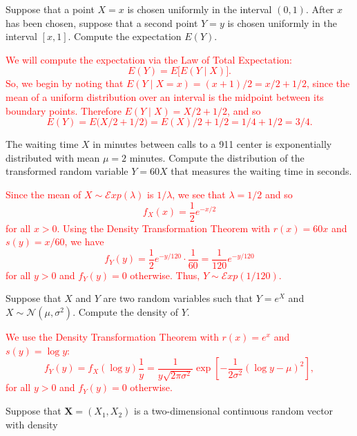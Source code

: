 \documentclass[12pt,reqno]{amsart}
\begin{document}
\prob Suppose that a point $X=x$ is chosen uniformly in the interval $(0,1)$. After $x$ has been chosen, suppose that a second point $Y=y$ is chosen uniformly in the interval $[x,1]$. Compute the expectation $E(Y)$.

\bigskip
\textcolor{red}{We will compute the expectation via the Law of Total Expectation:
	\[E(Y) = E \big[ E(Y\mid X) \big].
	\]
So, we begin by noting that $E(Y\mid X=x) = (x+1)/2 = x/2 + 1/2$, since the mean of a uniform distribution over an interval is the midpoint between its boundary points. Therefore $E(Y\mid X) = X/2 + 1/2$, and so
	\[E(Y) = E\big( X/2 + 1/2\big) = E(X) /2 + 1/2 = 1/4 + 1/2 = 3/4.
	\]}
\bigskip










\prob The waiting time $X$ in minutes between calls to a 911 center is exponentially distributed with mean $\mu = 2$ minutes. Compute the distribution of the transformed random variable $Y=60X$ that measures the waiting time in seconds.

\bigskip
\textcolor{red}{Since the mean of $X\sim \mathcal{E}xp(\lambda)$ is $1/\lambda$, we see that $\lambda = 1/2$ and so
	\[f_X(x) = \frac{1}{2} e^{-x/2}
	\]
for all $x>0$. Using the Density Transformation Theorem with $r(x) = 60x$ and $s(y) = x/60$, we have
	\[f_Y(y) = \frac{1}{2} e^{-y/120} \cdot \frac{1}{60} = \frac{1}{120} e^{-y/120}
	\]
for all $y>0$ and $f_Y(y)=0$ otherwise. Thus, $Y \sim \mathcal{E}xp(1/120)$.}
\bigskip












\prob Suppose that $X$ and $Y$ are two random variables such that $Y=e^X$ and $X\sim \mathcal{N}(\mu,\sigma^2)$. Compute the density of $Y$.

\bigskip
\textcolor{red}{We use the Density Transformation Theorem with $r(x) = e^x$ and $s(y) = \log{y}$:
	\[f_Y(y) = f_X(\log{y}) \frac{1}{y} = \frac{1}{y\sqrt{2\pi \sigma^2}} \exp \left[ - \frac{1}{2\sigma^2} \left(\log{y} - \mu  \right)^2 \right],
	\]
for all $y>0$ and $f_Y(y)=0$ otherwise.}
\bigskip









\prob Suppose that $\mathbf{X}=(X_1,X_2)$ is a two-dimensional continuous random vector with density
\end{document}

